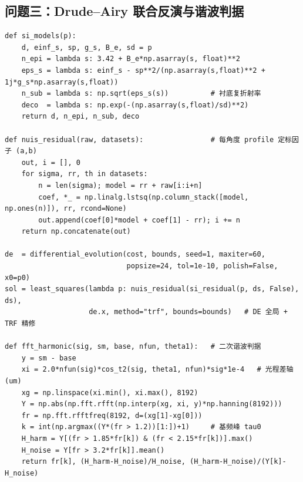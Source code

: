 \documentclass[11pt,a4paper,fontset=fandol]{ctexart}
\begin{document}
\subsection{问题三：Drude--Airy 联合反演与谐波判据}
\begin{lstlisting}
def si_models(p):
    d, einf_s, sp, g_s, B_e, sd = p
    n_epi = lambda s: 3.42 + B_e*np.asarray(s, float)**2
    eps_s = lambda s: einf_s - sp**2/(np.asarray(s,float)**2 + 1j*g_s*np.asarray(s,float))
    n_sub = lambda s: np.sqrt(eps_s(s))          # 衬底复折射率
    deco  = lambda s: np.exp(-(np.asarray(s,float)/sd)**2)
    return d, n_epi, n_sub, deco

def nuis_residual(raw, datasets):                # 每角度 profile 定标因子 (a,b)
    out, i = [], 0
    for sigma, rr, th in datasets:
        n = len(sigma); model = rr + raw[i:i+n]
        coef, *_ = np.linalg.lstsq(np.column_stack([model, np.ones(n)]), rr, rcond=None)
        out.append(coef[0]*model + coef[1] - rr); i += n
    return np.concatenate(out)

de  = differential_evolution(cost, bounds, seed=1, maxiter=60,
                             popsize=24, tol=1e-10, polish=False, x0=p0)
sol = least_squares(lambda p: nuis_residual(si_residual(p, ds, False), ds),
                    de.x, method="trf", bounds=bounds)   # DE 全局 + TRF 精修

def fft_harmonic(sig, sm, base, nfun, theta1):   # 二次谐波判据
    y = sm - base
    xi = 2.0*nfun(sig)*cos_t2(sig, theta1, nfun)*sig*1e-4   # 光程差轴 (um)
    xg = np.linspace(xi.min(), xi.max(), 8192)
    Y = np.abs(np.fft.rfft(np.interp(xg, xi, y)*np.hanning(8192)))
    fr = np.fft.rfftfreq(8192, d=(xg[1]-xg[0]))
    k = int(np.argmax((Y*(fr > 1.2))[1:])+1)     # 基频峰 tau0
    H_harm = Y[(fr > 1.85*fr[k]) & (fr < 2.15*fr[k])].max()
    H_noise = Y[fr > 3.2*fr[k]].mean()
    return fr[k], (H_harm-H_noise)/H_noise, (H_harm-H_noise)/(Y[k]-H_noise)
\end{lstlisting}
\end{document}

